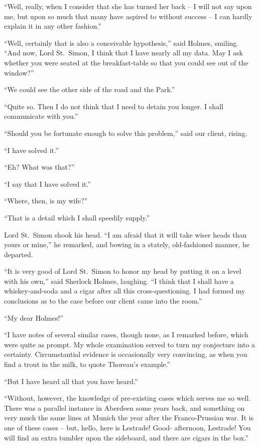 “Well, really, when I consider that she has turned her
back -- I will not say upon me, but upon so much that many
have aspired to without success -- I can hardly explain it in
any other fashion.”

“Well, certainly that is also a conceivable hypothesis,” said
Holmes, smiling. “And now, Lord St.~Simon, I think that I
have nearly all my data. May I ask whether you were seated
at the breakfast-table so that you could see out of the
window?”

“We could see the other side of the road and the Park.”

“Quite so. Then I do not think that I need to detain you
longer. I shall communicate with you.”

“Should you be fortunate enough to solve this problem,”
said our client, rising.

“I have solved it.”

“Eh? What was that?”

“I say that I have solved it.”

“Where, then, is my wife?”

“That is a detail which I shall speedily supply.”

Lord St.~Simon shook his head. “I am afraid that it will
take wiser heads than yours or mine,” he remarked, and bowing
in a stately, old-fashioned manner, he departed.

“It is very good of Lord St.~Simon to honor my head by
putting it on a level with his own,” said Sherlock Holmes,
laughing. “I think that I shall have a whiskey-and-soda and
a cigar after all this cross-questioning. I had formed my
conclusions as to the case before our client came into the room.”

“My dear Holmes!”

“I have notes of several similar cases, though none, as I
remarked before, which were quite as prompt. My whole examination
served to turn my conjecture into a certainty.
Circumstantial evidence is occasionally very convincing, as when
you find a trout in the milk, to quote Thoreau’s example.”

“But I have heard all that you have heard.”

“Without, however, the knowledge of pre-exist\-ing cases
which serves me so well. There was a parallel instance in
Aberdeen some years back, and something on very much the
same lines at Munich the year after the Franco-Prussian war.
It is one of these cases -- but, hello, here is Lestrade! Good-%
afternoon, Lestrade! You will find an extra tumbler upon
the sideboard, and there are cigars in the box.”

